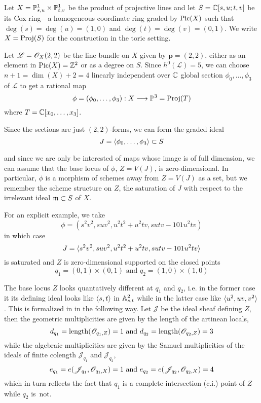 \documentclass[fleqn,reqno]{amsart}
\numberwithin{first}{chapter}
\begin{document}
\begin{example}[$\mt{ex203}$]
\label{ex203}
Let $X=\PP^1_{s,u}\times\PP^1_{t,v}$ be the product of projective lines and let $S=\CC[s,u;t,v]$
be its Cox ring---a homogeneous coordinate ring graded by $\Pic(X)$ such that $\deg(s)=\deg(u)=(1,0)$
and $\deg(t)=\deg(v)=(0,1)$.
We write $X=\Proj(S)$ for the construction in the toric setting.

Let $\mathscr{L}=\O_X(2,2)$ be the line bundle on $X$ given by $\mathbf p=(2,2)$,
either as an element in $\Pic(X)=\ZZ^2$ or as a degree on $S$.
Since $h^0(\mathscr{L})=5$, we can choose $n+1=\dim(X)+2=4$ linearly independent over $\CC$
global section $\phi_0,\ldots,\phi_3$ of $\mathscr{L}$ to get a rational map
\[
	\phi=(\phi_0,\ldots,\phi_3):X\To\PP^3=\Proj(T)
\]
where $T=\CC[x_0,\ldots,x_3]$.

Since the sections are just $(2,2)$-forms, we can form the graded ideal
\[
	J=\la \phi_0,\ldots,\phi_3\ra\se S
\]

and since we are only be interested of maps whose image is of full dimension,
we can assume that the base locus of $\phi$, $Z=V(J)$, is zero-dimensional.
In particular, $\phi$ is a morphism of schemes away from $Z=V(J)$ as a set,
but we remember the scheme structure on $Z$,
the saturation of $J$ with respect to the irrelevant ideal $\m\se S$ of $X$.

For an explicit example, we take
\[
	\phi=(s^{2} v^{2},s u v^{2},u^{2} t^{2}+u^{2} t v,s u t v-101 u^{2}t v)
\]
in which case
\[
	J=\la s^{2} v^{2},s u v^{2},u^{2} t^{2}+u^{2} t v,s u t v-101 u^{2}t v\ra
\]
is saturated and $Z$ is zero-dimensional supported on the closed points
\[
	q_1=(0,1)\times(0,1) \text{ and } q_2=(1,0)\times(1,0)
\]

The base locus $Z$ looks quantatively different at $q_1$ and $q_2$, i.e.
in the former case it its defining ideal looks like $\la s,t\ra$ in $\AA^2_{s,t}$
while in the latter case like $\la u^2,uv,v^2\ra$.
This is formalized in in the following way.
Let $\mathscr{J}$ be the ideal sheaf defining $Z$,
then the geometric multiplicities are given by the length of the artinean locals,
\[
	d_{q_1}=\length(\O_{q_1,Z})=1 \text{ and } d_{q_2}=\length(\O_{q_2,Z})=3
\]
while the algebraic multiplicities are given by the Samuel multiplicities
of the ideals of finite colength $\mathscr{J}_{q_1}$ and $\mathscr{J}_{q_2}$,
\[
	e_{q_1}=e(\mathscr{J}_{q_1},\O_{q_1,X})=1 \text{ and } e_{q_2}=e(\mathscr{J}_{q_2},\O_{q_2,X})=4
\]
which in turn reflects the fact that $q_1$ is a complete intersection (c.i.) point of $Z$
while $q_2$ is~not.


\end{example}
\end{document}
